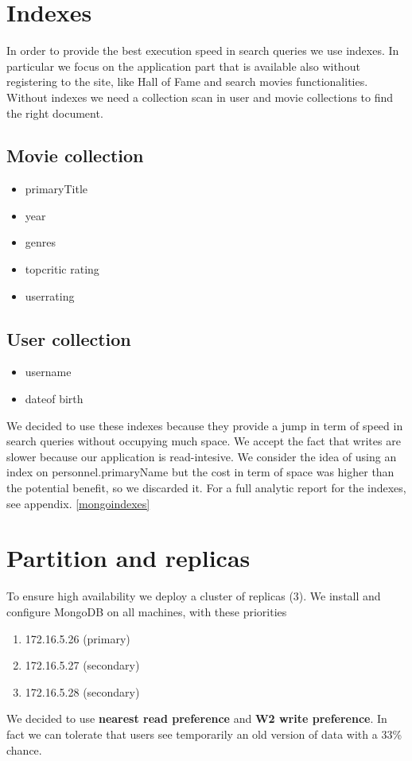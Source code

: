 \section{Indexes}
In order to provide the best execution speed in search queries we use indexes. In particular we focus on the application part that is available also without registering to the site, like Hall of Fame and search movies functionalities. Without indexes we need a collection scan in user and movie collections to find the right document. \\
\subsection{Movie collection}
\begin{itemize}
\item primaryTitle
\item year
\item genres
\item top\textunderscore critic \textunderscore rating
\item user\textunderscore rating
\end{itemize}

\subsection{User collection}
\begin{itemize}
\item username
\item date\textunderscore of \textunderscore birth
\end{itemize}


We decided to use these indexes because they provide a jump in term of speed in search queries without occupying much space. We accept the fact that writes are slower because our application is read-intesive. We consider the idea of using an index on personnel.primaryName but the cost in term of space was higher than the potential benefit, so we discarded it.
For a full analytic report for the indexes, see appendix. \cref{mongoindexes}
\section{Partition and replicas}
To ensure high availability we deploy a cluster of replicas (3). We install and configure MongoDB on all machines, with these priorities 
\begin{enumerate}
 \item 172.16.5.26 (primary)
 \item 172.16.5.27 (secondary)
 \item 172.16.5.28 (secondary)
 \end{enumerate} 
We decided to use \textbf{nearest read preference} and \textbf{W2 write preference}. In fact we can tolerate that users see temporarily an old version of data with a 33\% chance. 


